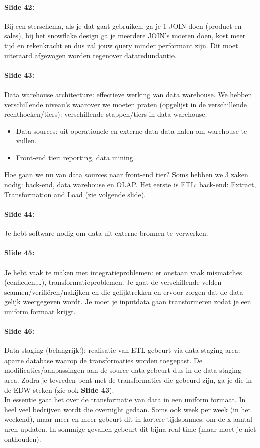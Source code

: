 \documentclass[10pt,a4paper]{report}
\begin{document}
\paragraph{Slide 42:}Bij een sterschema, als je dat gaat gebruiken, ga je 1 JOIN doen (product en sales), bij het snowflake design ga je meerdere JOIN's moeten doen, kost meer tijd en rekenkracht en dus zal jouw query minder performant zijn. Dit moet uiteraard afgewogen worden tegenover dataredundantie.

\paragraph{Slide 43:}Data warehouse architecture: effectieve werking van data warehouse. We hebben verschillende niveau's waarover we moeten praten (opgelijst in de verschillende rechthoeken/tiers): verschillende stappen/tiers in data warehouse.
\begin{itemize}
\item Data sources: uit operationele en externe data data halen om warehouse te vullen.
\item Front-end tier: reporting, data mining.
\end{itemize}
Hoe gaan we nu van data sources naar front-end tier? Soms hebben we 3 zaken nodig: back-end, data warehouse en OLAP. Het eerste is ETL: back-end: Extract, Transformation and Load (zie volgende slide).

\paragraph{Slide 44:}Je hebt software nodig om data uit externe bronnen te verwerken. 

\paragraph{Slide 45:}Je hebt vaak te maken met integratieproblemen: er onstaan vaak mismatches (eenheden,…), transformatieproblemen. Je gaat de verschillende velden scannen/verifi\"eren/nakijken en die gelijktrekken en ervoor zorgen dat de data gelijk weergegeven wordt. Je moet je inputdata gaan transformeren zodat je een uniform formaat krijgt.

\paragraph{Slide 46:}Data staging (belangrijk!): realisatie van ETL gebeurt via data staging area: aparte database waarop de transformaties worden toegepast. De modificaties/aanpassingen aan de source data gebeurt dus in de data staging area. Zodra je tevreden bent met de transformaties die gebeurd zijn, ga je die in de EDW steken (zie ook \textbf{Slide 43}).\\
In essentie gaat het over de transformatie van data in een uniform formaat.
In heel veel bedrijven wordt die overnight gedaan. Soms ook week per week (in het weekend), maar meer en meer gebeurt dit in kortere tijdspannes: om de x aantal uren updaten. In sommige gevallen gebeurt dit bijna real time (maar moet je niet onthouden).
\end{document}
